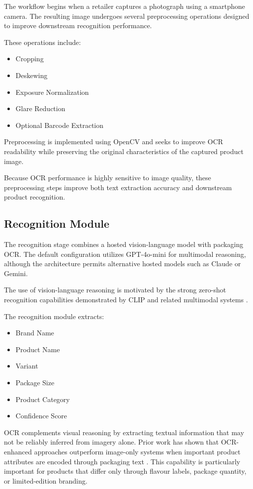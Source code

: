 \documentclass[conference]{IEEEtran}
\begin{document}
The workflow begins when a retailer captures a photograph using a
smartphone camera. The resulting image undergoes several preprocessing
operations designed to improve downstream recognition performance.

These operations include:

\begin{itemize}
\item Cropping
\item Deskewing
\item Exposure Normalization
\item Glare Reduction
\item Optional Barcode Extraction
\end{itemize}

Preprocessing is implemented using OpenCV and seeks to improve OCR
readability while preserving the original characteristics of the
captured product image.

Because OCR performance is highly sensitive to image quality,
these preprocessing steps improve both text extraction accuracy
and downstream product recognition.

\subsection{Recognition Module}

The recognition stage combines a hosted vision-language model with
packaging OCR. The default configuration utilizes GPT-4o-mini for
multimodal reasoning, although the architecture permits alternative
hosted models such as Claude or Gemini.

The use of vision-language reasoning is motivated by the strong
zero-shot recognition capabilities demonstrated by CLIP and related
multimodal systems \cite{radford2021clip}.

The recognition module extracts:

\begin{itemize}
\item Brand Name
\item Product Name
\item Variant
\item Package Size
\item Product Category
\item Confidence Score
\end{itemize}

OCR complements visual reasoning by extracting textual information
that may not be reliably inferred from imagery alone. Prior work has
shown that OCR-enhanced approaches outperform image-only systems when
important product attributes are encoded through packaging text
\cite{ocrfusion2023}. This capability is particularly important for
products that differ only through flavour labels, package quantity,
or limited-edition branding.
\end{document}
